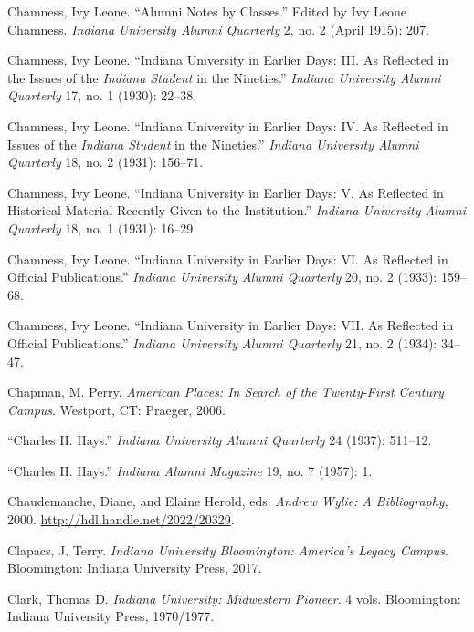 \documentclass[
  american,
  letterpaper,
]{scrreprt}
\newlength{\cslhangindent}
\newenvironment{CSLReferences}[2] %
 {\begin{list}{}{%
  \setlength{\itemindent}{0pt}
  \setlength{\leftmargin}{0pt}
  \setlength{\parsep}{0pt}
  \ifodd #1
   \setlength{\leftmargin}{\cslhangindent}
   \setlength{\itemindent}{-1\cslhangindent}
  \fi
  \setlength{\itemsep}{#2\baselineskip}}}
 {\end{list}}
\begin{document}
\begin{CSLReferences}{1}{0}
Chamness, Ivy Leone. {``Alumni Notes by Classes.''} Edited by Ivy Leone
Chamness. \emph{Indiana University Alumni Quarterly} 2, no. 2 (April
1915): 207.

Chamness, Ivy Leone. {``Indiana University in Earlier Days: III. As
Reflected in the Issues of the \emph{Indiana Student} in the
Nineties.''} \emph{Indiana University Alumni Quarterly} 17, no. 1
(1930): 22--38.

Chamness, Ivy Leone. {``Indiana University in Earlier Days: IV. As
Reflected in Issues of the \emph{Indiana Student} in the Nineties.''}
\emph{Indiana University Alumni Quarterly} 18, no. 2 (1931): 156--71.

Chamness, Ivy Leone. {``Indiana University in Earlier Days: V. As
Reflected in Historical Material Recently Given to the Institution.''}
\emph{Indiana University Alumni Quarterly} 18, no. 1 (1931): 16--29.

Chamness, Ivy Leone. {``Indiana University in Earlier Days: VI. As
Reflected in Official Publications.''} \emph{Indiana University Alumni
Quarterly} 20, no. 2 (1933): 159--68.

Chamness, Ivy Leone. {``Indiana University in Earlier Days: VII. As
Reflected in Official Publications.''} \emph{Indiana University Alumni
Quarterly} 21, no. 2 (1934): 34--47.

Chapman, M. Perry. \emph{American Places: In Search of the Twenty-First
Century Campus}. Westport, CT: Praeger, 2006.

{``{Charles H. Hays}.''} \emph{Indiana University Alumni Quarterly} 24
(1937): 511--12.

{``{Charles H. Hays}.''} \emph{Indiana Alumni Magazine} 19, no. 7
(1957): 1.

Chaudemanche, Diane, and Elaine Herold, eds. \emph{Andrew Wylie: A
Bibliography}, 2000. \url{http://hdl.handle.net/2022/20329}.

Clapacs, J. Terry. \emph{Indiana University Bloomington: America's
Legacy Campus}. Bloomington: Indiana University Press, 2017.

Clark, Thomas D. \emph{Indiana University: Midwestern Pioneer}. 4 vols.
Bloomington: Indiana University Press, 1970/1977.


\end{CSLReferences}
\end{document}
